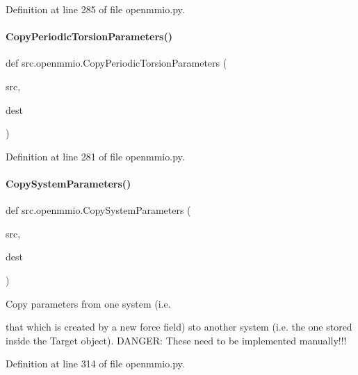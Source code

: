 Definition at line 285 of file openmmio.\+py.

\mbox{\label{namespacesrc_1_1openmmio_a69e8771291135627a9500f379be6746d}} 
\paragraph{\texorpdfstring{Copy\+Periodic\+Torsion\+Parameters()}{CopyPeriodicTorsionParameters()}}
{\footnotesize\ttfamily def src.\+openmmio.\+Copy\+Periodic\+Torsion\+Parameters (\begin{DoxyParamCaption}\item[{}]{src,  }\item[{}]{dest }\end{DoxyParamCaption})}



Definition at line 281 of file openmmio.\+py.

\mbox{\label{namespacesrc_1_1openmmio_aeab37a6fcba5be52553047efcdb14f58}} 
\paragraph{\texorpdfstring{Copy\+System\+Parameters()}{CopySystemParameters()}}
{\footnotesize\ttfamily def src.\+openmmio.\+Copy\+System\+Parameters (\begin{DoxyParamCaption}\item[{}]{src,  }\item[{}]{dest }\end{DoxyParamCaption})}



Copy parameters from one system (i.\+e. 

that which is created by a new force field) sto another system (i.\+e. the one stored inside the Target object). D\+A\+N\+G\+ER\+: These need to be implemented manually!!! 

Definition at line 314 of file openmmio.\+py.

\mbox{\label{namespacesrc_1_1openmmio_a4e11fdb61d3e9174f761f7ba87b0fb4c}} 
